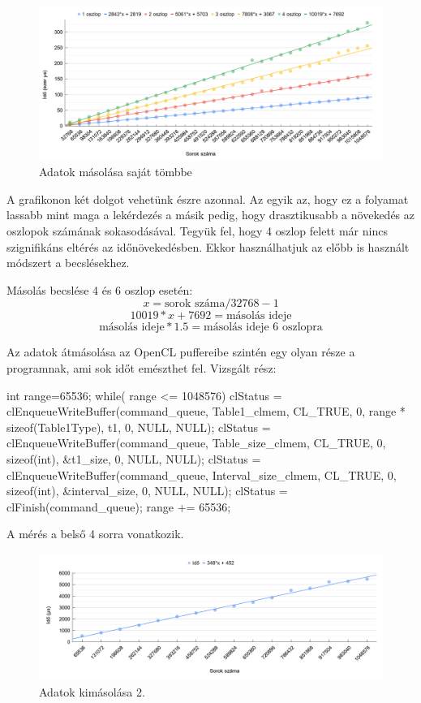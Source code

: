 \begin{figure}[h!]
\centering
\includegraphics[width=\textwidth]{images/ccopy.png}
\caption{Adatok másolása saját tömbbe}
\label{fig:schema}
\end{figure}

A grafikonon két dolgot vehetünk észre azonnal. Az egyik az, hogy ez a folyamat lassabb mint maga a lekérdezés a másik pedig, hogy drasztikusabb a növekedés az oszlopok számának sokasodásával.
Tegyük fel, hogy 4 oszlop felett már nincs szignifikáns eltérés az időnövekedésben. Ekkor használhatjuk az előbb is használt módszert a becslésekhez.

Másolás becslése 4 és 6 oszlop esetén:
$$ x = \text{sorok száma}/32768 - 1 $$
$$ 10019 * x + 7692 = \text{másolás ideje}$$
$$ \text{másolás ideje} * 1.5 = \text{másolás ideje 6 oszlopra} $$


Az adatok átmásolása az OpenCL puffereibe szintén egy olyan része a programnak, ami sok időt emészthet fel.
Vizsgált rész:

\begin{python}
int range=65536;
while( range <= 1048576){
 clStatus = clEnqueueWriteBuffer(command_queue, Table1_clmem,
  CL_TRUE, 0, range * sizeof(Table1Type), t1, 0, NULL, NULL);
 clStatus = clEnqueueWriteBuffer(command_queue, Table_size_clmem,
  CL_TRUE, 0, sizeof(int), &t1_size, 0, NULL, NULL);
 clStatus = clEnqueueWriteBuffer(command_queue, Interval_size_clmem,
  CL_TRUE, 0, sizeof(int), &interval_size, 0, NULL, NULL);
 clStatus = clFinish(command_queue);
	range += 65536;
}
\end{python}

A mérés a belső 4 sorra vonatkozik. 

\begin{figure}[h!]
\centering
\includegraphics[width=\textwidth]{images/inpuffer.png}
\caption{Adatok kimásolása 2.}
\label{fig:schema}
\end{figure}

